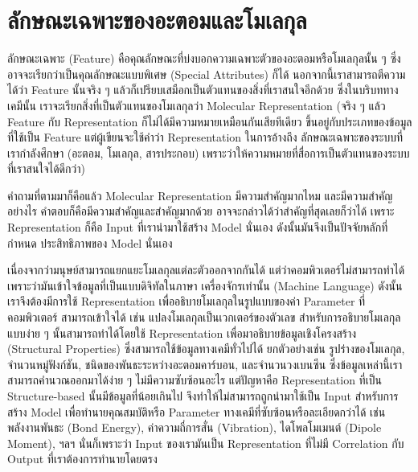 

\chapter{ลักษณะเฉพาะของอะตอมและโมเลกุล}
\label{ch:feature}

ลักษณะเฉพาะ (Feature) คือคุณลักษณะที่บ่งบอกความเฉพาะตัวของอะตอมหรือโมเลกุลนั้น ๆ ซึ่งอาจจะเรียกว่าเป็นคุณลักษณะแบบพิเศษ 
(Special Attributes) ก็ได้ นอกจากนี้เราสามารถตีความได้ว่า Feature นั้นจริง ๆ แล้วก็เปรียบเสมือกเป็นตัวแทนของสิ่งที่เราสนใจอีกด้วย 
ซึ่งในบริบททางเคมีนั้น เราจะเรียกสิ่งที่เป็นตัวแทนของโมเลกุลว่า Molecular Representation (จริง ๆ แล้ว Feature กับ Representation 
ก็ไม่ได้มีความหมายเหมือนกันเสียทีเดียว ขึ้นอยู่กับประเภทของข้อมูลที่ใช้เป็น Feature แต่ผู้เขียนจะใช้คำว่า Representation ในการอ้างถึง%
ลักษณะเฉพาะของระบบที่เรากำลังศึกษา (อะตอม, โมเลกุล, สารประกอบ) เพราะว่าให้ความหมายที่สื่อการเป็นตัวแทนของระบบที่เราสนใจได้ดีกว่า)
\cite{stepisnik2021}

คำถามที่ตามมาก็คือแล้ว Molecular Representation มีความสำคัญมากไหม และมีความสำคัญอย่างไร คำตอบก็คือมีความสำคัญและสำคัญมากด้วย 
อาจจะกล่าวได้ว่าสำคัญที่สุดเลยก็ว่าได้ เพราะ Representation ก็คือ Input ที่เรานำมาใช้สร้าง Model นั่นเอง ดังนั้นมันจึงเป็นปัจจัยหลักที่กำหนด%
ประสิทธิภาพของ Model นั่นเอง 

เนื่องจากว่ามนุษย์สามารถแยกแยะโมเลกุลแต่ละตัวออกจากกันได้ แต่ว่าคอมพิวเตอร์ไม่สามารถทำได้ เพราะว่ามันเข้าใจข้อมูลที่เป็นแบบดิจิทัลในภาษา%
เครื่องจักรเท่านั้น (Machine Language) ดังนั้นเราจึงต้องมีการใช้ Representation เพื่ออธิบายโมเลกุลในรูปแบบของค่า Parameter ที่คอมพิวเตอร์%
สามารถเข้าใจได้ เช่น แปลงโมเลกุลเป็นเวกเตอร์ของตัวเลข สำหรับการอธิบายโมเลกุลแบบง่าย ๆ นั้นสามารถทำได้โดยใช้ Representation 
เพื่อมาอธิบายข้อมูลเชิงโครงสร้าง (Structural Properties) ซึ่งสามารถใช้ข้อมูลทางเคมีทั่วไปได้ ยกตัวอย่างเช่น รูปร่างของโมเลกุล, 
จำนวนหมู่ฟังก์ชัน, ชนิดของพันธะระหว่างอะตอมคาร์บอน, และจำนวนวงเบนซีน ซึ่งข้อมูลเหล่านี้เราสามารถคำนวณออกมาได้ง่าย ๆ ไม่มีความซับซ้อนอะไร 
แต่ปัญหาคือ Representation ที่เป็น Structure-based นั้นมีข้อมูลที่น้อยเกินไป จึงทำให้ไม่สามารถถูกนำมาใช้เป็น Input สำหรับการสร้าง Model 
เพื่อทำนายคุณสมบัติหรือ Parameter ทางเคมีที่ซับซ้อนหรือละเอียดกว่าได้ 
เช่น พลังงานพันธะ (Bond Energy), ค่าความถี่การสั่น (Vibration), ไดโพลโมเมนต์ (Dipole Moment), ฯลฯ นั่นก็เพราะว่า Input 
ของเรามันเป็น Representation ที่ไม่มี Correlation กับ Output ที่เราต้องการทำนายโดยตรง

